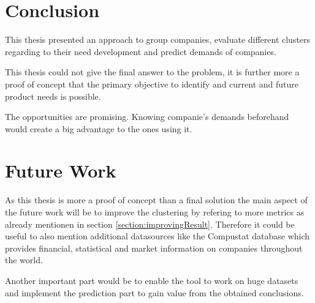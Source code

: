 \section{Conclusion}
This thesis presented an approach to group companies, evaluate different clusters regarding
to their need development and predict demands of companies.

This thesis could not give the final answer to the problem, it is further more a
proof of concept that the primary objective to identify and current and future product
needs is possible.

The opportunities are promising. Knowing companie's demands beforehand would create a big
advantage to the ones using it.

\section{Future Work}
As this thesis is more a proof of concept than a final solution the main aspect of the
future work will be to improve the clustering by refering to more metrics as already mentionen
in section \ref{section:improvingResult}. Therefore it could be useful to also mention additional
datasources like the Compustat database which provides financial, statistical and market information
on companies throughout the world.

Another important part would be to enable the tool to work on huge datasets and implement the prediction
part to gain value from the obtained conclusions.
